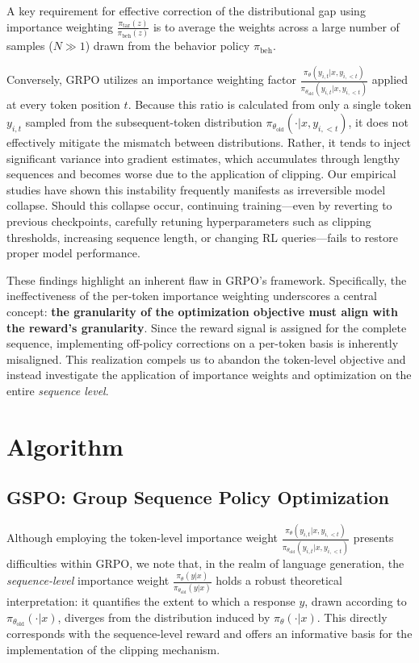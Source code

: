 A key requirement for effective correction of the distributional gap using importance weighting $\frac{ \pi_\text{tar} (z) }{ \pi_\text{beh} (z)}$ is to average the weights across a large number of samples ($N \gg 1$) drawn from the behavior policy $\pi_\text{beh}$.

Conversely, GRPO utilizes an importance weighting factor $\frac{ \pi_{\theta} (y_{i,t} | x, y_{i,<t}) }{ \pi_{\theta_\text{old}} (y_{i,t} | x,y_{i,<t})}$ applied at every token position $t$. Because this ratio is calculated from only a single token $y_{i,t}$ sampled from the subsequent-token distribution $\pi_{\theta_\text{old}}( \cdot | x, y_{i, <t})$, it does not effectively mitigate the mismatch between distributions. Rather, it tends to inject significant variance into gradient estimates, which accumulates through lengthy sequences and becomes worse due to the application of clipping. Our empirical studies have shown this instability frequently manifests as irreversible model collapse. Should this collapse occur, continuing training—even by reverting to previous checkpoints, carefully retuning hyperparameters such as clipping thresholds, increasing sequence length, or changing RL queries—fails to restore proper model performance.

These findings highlight an inherent flaw in GRPO’s framework. Specifically, the ineffectiveness of the per-token importance weighting underscores a central concept: \textbf{the granularity of the optimization objective must align with the reward’s granularity}. Since the reward signal is assigned for the complete sequence, implementing off-policy corrections on a per-token basis is inherently misaligned. This realization compels us to abandon the token-level objective and instead investigate the application of importance weights and optimization on the entire \textit{sequence level}.

\section{Algorithm}

\subsection{GSPO: Group Sequence Policy Optimization}

Although employing the token-level importance weight $\frac{ \pi_{\theta} (y_{i,t} | x, y_{i,<t}) }{ \pi_{\theta_\text{old}} (y_{i,t} | x,y_{i,<t})}$ presents difficulties within GRPO, we note that, in the realm of language generation, the \textit{sequence-level} importance weight $\frac{ \pi_{\theta} (y | x) }{ \pi_{\theta_\text{old}} (y | x)}$ holds a robust theoretical interpretation: it quantifies the extent to which a response $y$, drawn according to $\pi_{\theta_\text{old}} (\cdot | x)$, diverges from the distribution induced by $\pi_{\theta} (\cdot | x)$. This directly corresponds with the sequence-level reward and offers an informative basis for the implementation of the clipping mechanism.

